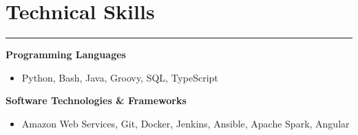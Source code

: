 \documentclass[11pt]{article}
\newcommand{\resumesection}[1]{\vspace{-0.5cm}\section*{\LARGE#1}\vspace{-0.2cm}\hrule\vspace{0.2cm}}
\begin{document}
% 


\vspace{0.2cm}
\resumesection{Technical Skills}

\textbf{Programming Languages}
\begin{itemize}
  \item Python, Bash, Java, Groovy, SQL, TypeScript
\end{itemize}

\textbf{Software Technologies \& Frameworks}
\begin{itemize}
  \item{Amazon Web Services, Git, Docker, Jenkins, Ansible, Apache Spark, Angular}
\end{itemize}
\end{document}
